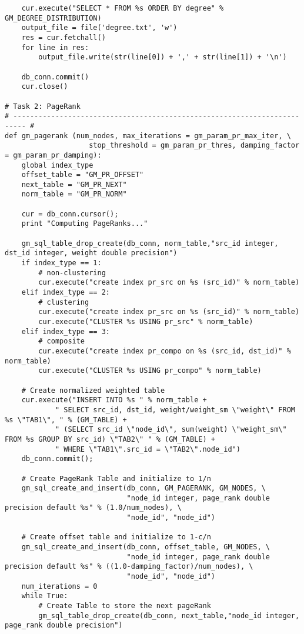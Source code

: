 \documentclass[11pt]{article}
\begin{document}
\begin{lstlisting}
    cur.execute("SELECT * FROM %s ORDER BY degree" % GM_DEGREE_DISTRIBUTION)
    output_file = file('degree.txt', 'w')
    res = cur.fetchall()
    for line in res:
        output_file.write(str(line[0]) + ',' + str(line[1]) + '\n')

    db_conn.commit()                        
    cur.close()

# Task 2: PageRank
# ------------------------------------------------------------------------- #
def gm_pagerank (num_nodes, max_iterations = gm_param_pr_max_iter, \
                    stop_threshold = gm_param_pr_thres, damping_factor = gm_param_pr_damping):
    global index_type
    offset_table = "GM_PR_OFFSET"
    next_table = "GM_PR_NEXT"
    norm_table = "GM_PR_NORM"
    
    cur = db_conn.cursor();
    print "Computing PageRanks..."
    
    gm_sql_table_drop_create(db_conn, norm_table,"src_id integer, dst_id integer, weight double precision")
    if index_type == 1:
        # non-clustering           
        cur.execute("create index pr_src on %s (src_id)" % norm_table)
    elif index_type == 2:
        # clustering
        cur.execute("create index pr_src on %s (src_id)" % norm_table)
        cur.execute("CLUSTER %s USING pr_src" % norm_table)
    elif index_type == 3:
        # composite
        cur.execute("create index pr_compo on %s (src_id, dst_id)" % norm_table)
        cur.execute("CLUSTER %s USING pr_compo" % norm_table)
    
    # Create normalized weighted table
    cur.execute("INSERT INTO %s " % norm_table + 
            " SELECT src_id, dst_id, weight/weight_sm \"weight\" FROM %s \"TAB1\", " % (GM_TABLE) +
            " (SELECT src_id \"node_id\", sum(weight) \"weight_sm\" FROM %s GROUP BY src_id) \"TAB2\" " % (GM_TABLE) + 
            " WHERE \"TAB1\".src_id = \"TAB2\".node_id")    
    db_conn.commit();
      
    # Create PageRank Table and initialize to 1/n
    gm_sql_create_and_insert(db_conn, GM_PAGERANK, GM_NODES, \
                             "node_id integer, page_rank double precision default %s" % (1.0/num_nodes), \
                             "node_id", "node_id")
                             
    # Create offset table and initialize to 1-c/n
    gm_sql_create_and_insert(db_conn, offset_table, GM_NODES, \
                             "node_id integer, page_rank double precision default %s" % ((1.0-damping_factor)/num_nodes), \
                             "node_id", "node_id")
    num_iterations = 0
    while True:
        # Create Table to store the next pageRank
        gm_sql_table_drop_create(db_conn, next_table,"node_id integer, page_rank double precision")
        

\end{lstlisting}
\end{document}
